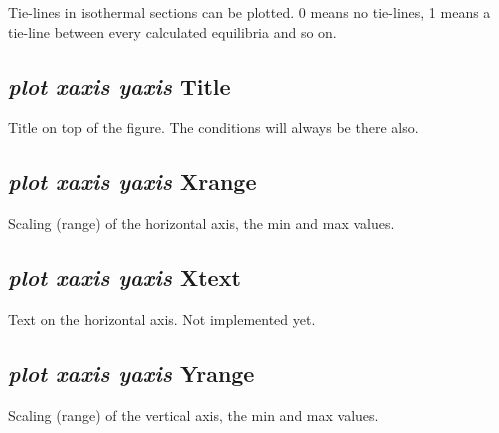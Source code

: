 \documentclass[12pt]{article}
\begin{document}
Tie-lines in isothermal sections can be plotted.  0 means no
tie-lines, 1 means a tie-line between every calculated equilibria and
so on.

\subsection{{\em plot xaxis yaxis} Title}

Title on top of the figure.  The conditions will always be there also.

\subsection{{\em plot xaxis yaxis} Xrange}

Scaling (range) of the horizontal axis, the min and max values.

\subsection{{\em plot xaxis yaxis} Xtext}

Text on the horizontal axis. Not implemented yet.

\subsection{{\em plot xaxis yaxis} Yrange}

Scaling (range) of the vertical axis, the min and max values.

\end{document}
